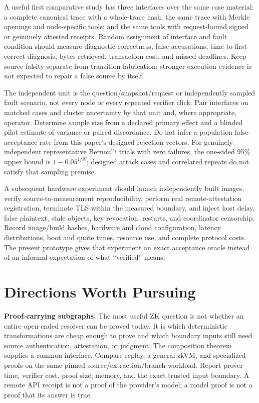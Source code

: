 A useful first comparative study has three interfaces over the same case material: a complete canonical trace with a whole-trace hash; the same trace with Merkle openings and node-specific tools; and the same tools with request-bound signed or genuinely attested receipts. Random assignment of interface and fault condition should measure diagnostic correctness, false accusations, time to first correct diagnosis, bytes retrieved, transaction cost, and missed deadlines. Keep source falsity separate from transition fabrication: stronger execution evidence is not expected to repair a false source by itself.

The independent unit is the question/snapshot/request or independently sampled fault scenario, not every node or every repeated verifier click. Pair interfaces on matched cases and cluster uncertainty by that unit and, where appropriate, operator. Determine sample size from a declared primary effect and a blinded pilot estimate of variance or paired discordance. Do not infer a population false-acceptance rate from this paper's designed rejection vectors. For genuinely independent representative Bernoulli trials with zero failures, the one-sided 95\% upper bound is $1-0.05^{1/N}$; designed attack cases and correlated repeats do not satisfy that sampling premise.

A subsequent hardware experiment should launch independently built images, verify source-to-measurement reproducibility, perform real remote-attestation registration, terminate TLS within the measured boundary, and inject host delay, false plaintext, stale objects, key revocation, restarts, and coordinator censorship. Record image/build hashes, hardware and cloud configuration, latency distributions, boot and quote times, resource use, and complete protocol costs. The present prototype gives that experiment an exact acceptance oracle instead of an informal expectation of what ``verified'' means.

\section{Directions Worth Pursuing}
\label{sec:directions}

\textbf{Proof-carrying subgraphs.} The most useful ZK question is not whether an entire open-ended resolver can be proved today. It is which deterministic transformations are cheap enough to prove and which boundary inputs still need source authentication, attestation, or judgment. The composition theorem supplies a common interface. Compare replay, a general zkVM, and specialized proofs on the same pinned source/extraction/branch workload. Report prover time, verifier cost, proof size, memory, and the exact trusted input boundary. A remote API receipt is not a proof of the provider's model; a model proof is not a proof that its answer is true.

